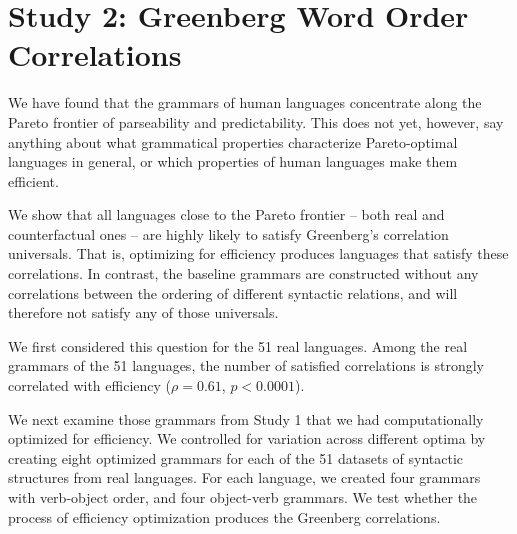 \documentclass[9pt,twocolumn,twoside,lineno]{pnas-new}
\begin{document}
\section*{Study 2: Greenberg Word Order Correlations}
\label{sec:greenberg}





We have found that the grammars of human languages concentrate along the Pareto frontier of parseability and predictability.
This does not yet, however, say anything about what grammatical properties characterize Pareto-optimal languages in general, or which properties of human languages make them efficient.



We show that all languages close to the Pareto frontier -- both real and counterfactual ones -- are highly likely to satisfy Greenberg's correlation universals.
That is, optimizing for efficiency produces languages that satisfy these correlations.
In contrast, the baseline grammars are constructed without any correlations between the ordering of different syntactic relations, and will therefore not satisfy any of those universals.

We first considered this question for the 51 real languages.
Among the real grammars of the 51 languages, the number of satisfied correlations is strongly correlated with efficiency ($\rho = 0.61$, $p<0.0001$). %


We next examine those grammars from Study 1 that we had computationally optimized for efficiency.
We controlled for variation across different optima by creating eight optimized grammars for each of the 51 datasets of syntactic structures from real languages.
For each language, we created four grammars with verb-object order, and four object-verb grammars.
We test whether the process of efficiency optimization produces the Greenberg correlations.
\end{document}
